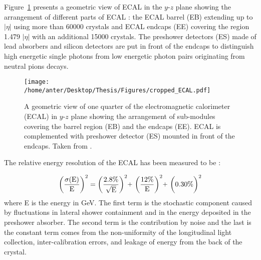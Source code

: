 Figure~\ref{fig:ecal} presents a geometric view of ECAL in the $y$-$z$ plane showing the arrangement of different parts of ECAL 
: the ECAL barrel (EB) extending up to $|\eta|$  using more than 60000 crystals and ECAL endcaps (EE) covering the region 1.479 \ls $|\eta|$  with an additional 15000 crystals. The preshower detectors (ES) made of lead absorbers and silicon detectors are put in front of the endcaps to distinguish high energetic single photons from low energetic photon pairs originating from neutral pions decays.

\begin{figure}[!h]
\begin{center}
\vspace*{3mm} 
\hspace*{-5mm}
\texttt{[image: /home/anter/Desktop/Thesis/Figures/cropped\_ECAL.pdf]}\\
\vspace*{2mm}
\caption{A geometric view of one quarter of the electromagnetic calorimeter (ECAL) in $y$-$z$ plane showing the arrangement of sub-modules covering the barrel region (EB) and the endcaps (EE). ECAL is complemented with preshower detector (ES) mounted in front of the endcaps. Taken from \cite{Bayatian:2006nff}.}
\label{fig:ecal}
\end{center}
\end{figure}

The relative energy resolution of the ECAL has been measured to be \cite{Adzic:2007mi} :

\begin{equation}
{\rm \bigg(\frac{\sigma(E)}{E}\bigg)^2 = \bigg(\frac{2.8\%}{\sqrt{E}}\bigg)^2 \plus \bigg(\frac{12\%}{E}\bigg)^2 \plus \bigg(0.30\%\bigg)^2}
\end{equation}
where E is the energy in GeV. The first term is the stochastic component caused by fluctuations in lateral shower containment and in the energy deposited in the preshower absorber. The second term is the contribution by noise and the last is the constant term comes from the non-uniformity of the longitudinal light collection, inter-calibration errors, and leakage of energy from the back of the crystal.

